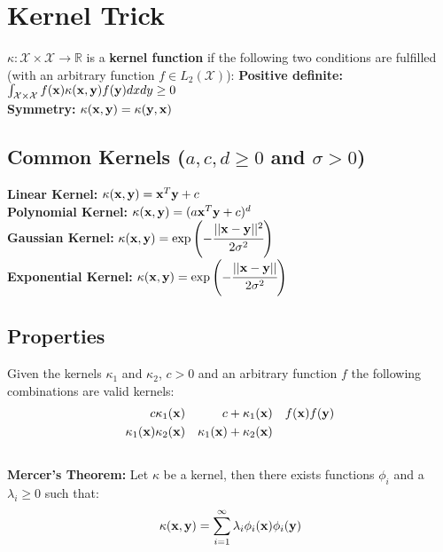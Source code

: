 \section{Kernel Trick}
\begin{mdframed}[style=eqbox]
$\kappa: \mathcal X \times \mathcal X \rightarrow \mathbb R$ is a \textbf{kernel function} if the following two conditions are fulfilled (with an arbitrary function $f \in L_2(\mathcal X)$):
\textbf{Positive definite:} $\int_{ \mathcal X \times \mathcal X} f(\mathbf{x}) \kappa(\mathbf{x}, \mathbf{y}) f( \mathbf{y}) dx dy \geq 0$\\
\textbf{Symmetry:}  $ \kappa(\mathbf{x}, \mathbf{y}) = \kappa(\mathbf{y}, \mathbf{x})$
\end{mdframed}
%
\begin{mdframed}[style=eqbox]
\subsection{Common Kernels (\(a, c, d \geq 0\) and \( \sigma > 0\))}
\textbf{Linear Kernel:} \(\kappa(\mathbf{x}, \mathbf{y}) = \mathbf{x}^T \mathbf{y} + c\)\\
\textbf{Polynomial Kernel:} \(\kappa(\mathbf{x}, \mathbf{y}) = (a \mathbf{x}^T \mathbf{y} + c)^d\)\\
\textbf{Gaussian Kernel:} \(\kappa(\mathbf{x}, \mathbf{y}) = \exp \left( -\cfrac{\vert\vert\mathbf{x} - \mathbf{y} \vert\vert^2}{2 \sigma^2} \right)\)\\
\textbf{Exponential Kernel:} \( \kappa(\mathbf{x}, \mathbf{y}) = \exp \left(- \cfrac{\vert\vert \mathbf{x} - \mathbf{y} \vert\vert}{2 \sigma^2} \right)\)
\end{mdframed}
%
\begin{mdframed}[style=eqbox]
\subsection{Properties}
Given the kernels $\kappa_1$ and $\kappa_2$, $c > 0$ and an arbitrary function $f$ the following combinations are valid kernels:
\vspace*{-8pt}\begin{align*}
  c \kappa_1(\mathbf{x}) && c + \kappa_1(\mathbf{x}) && f(\mathbf{x}) f(\mathbf{y})\\
  \kappa_1(\mathbf{x}) \kappa_2(\mathbf{x}) && \kappa_1(\mathbf{x}) + \kappa_2(\mathbf{x})
\end{align*}\vspace*{-16pt}\\
\textbf{Mercer's Theorem:}
Let $\kappa$ be a kernel, then there exists functions $\phi_i$ and a $\lambda_i \geq 0$ such that:
\vspace*{-8pt}\begin{align*}
\kappa(\mathbf{x}, \mathbf{y}) = \sum_{i=1}^{\infty} \lambda_i \phi_i(\mathbf{x}) \phi_i(\mathbf{y})
\end{align*}
\end{mdframed}